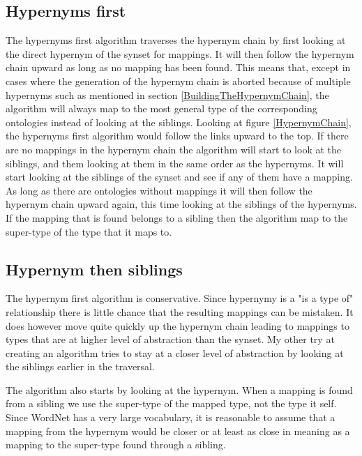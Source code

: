 \subsection{Hypernyms first}
The hypernyms first algorithm traverses the hypernym chain by first looking at the direct hypernym of the synset for mappings.
It will then follow the hypernym chain upward as long as no mapping has been found.
This means that,
except in cases where the generation of the hypernym chain is aborted because of multiple hypernyms such as mentioned in section \ref{BuildingTheHypernymChain},
the algorithm will always map to the most general type of the corresponding ontologies instead of looking at the siblings.
Looking at figure \ref{HypernymChain}, the hypernyms first algorithm would follow the links upward to the top.
If there are no mappings in the hypernym chain the algorithm will start to look at the siblings,
and them looking at them in the same order as the hypernyms.
It will start looking at the siblings of the synset and see if any of them have a mapping.
As long as there are ontologies without mappings it will then follow the hypernym chain upward again,
this time looking at the siblings of the hypernyms.
If the mapping that is found belongs to a sibling then the algorithm map to the super-type of the type that it maps to.

\subsection{Hypernym then siblings}
The hypernym first algorithm is conservative.
Since hypernymy is a "is a type of" relationship there is little chance that the resulting mappings can be mistaken.
It does however move quite quickly up the hypernym chain leading to mappings to types that are at higher level
of abstraction than the synset.
My other try at creating an algorithm tries to stay at a closer level of abstraction by looking at the siblings earlier
in the traversal.

The algorithm also starts by looking at the hypernym.
When a mapping is found from a sibling we use the super-type of the mapped type, not the type it self.
Since WordNet has a very large vocabulary,
it is reasonable to assume that a mapping from the hypernym would be closer or at least as close in meaning as a
mapping to the super-type found through a sibling.

